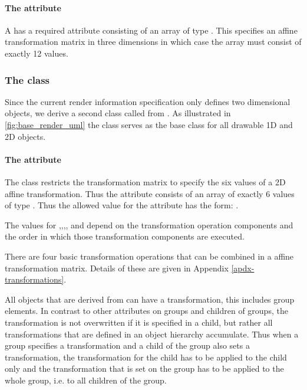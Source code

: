 \paragraph{The \fixttspace{} attribute}

A \Transformation has a required attribute  consisting
of an array of type . This specifies an affine transformation matrix in three dimensions in which case the array must consist of exactly 12 values.

\subsubsection{The  class}
\label{transformationtwod-class}

Since the current render information specification only defines two dimensional objects, we derive a second class called \TransformationTwoD from \Transformation. As illustrated in \ref{fig:base_render_uml} the class \TransformationTwoD serves as the base class for all drawable 1D and 2D objects.

\paragraph{The \fixttspace{} attribute}

The \TransformationTwoD class restricts the transformation matrix to specify the six values of a 2D affine transformation. Thus the  attribute consists of an array of exactly 6 values of type . Thus the allowed 
value for the attribute has the form: .

The values for ,,,, and  depend on the transformation operation components and the order in which those transformation components are executed.

There are four basic transformation operations that can be combined in a affine transformation matrix.  Details of these are given in Appendix \ref{apdx-transformations}.

All objects that are derived from \TransformationTwoD can have a transformation, this includes group elements. In contrast to other attributes on groups and children of groups, the transformation is not overwritten if it is specified in a child, but rather all transformations that are defined in an object hierarchy accumulate. Thus when a group specifies a transformation and a child of the group also sets a transformation, the transformation for the child has to be applied to the child only and the transformation that is set on the group has to be applied to the whole group, i.e. to all children of the group.

